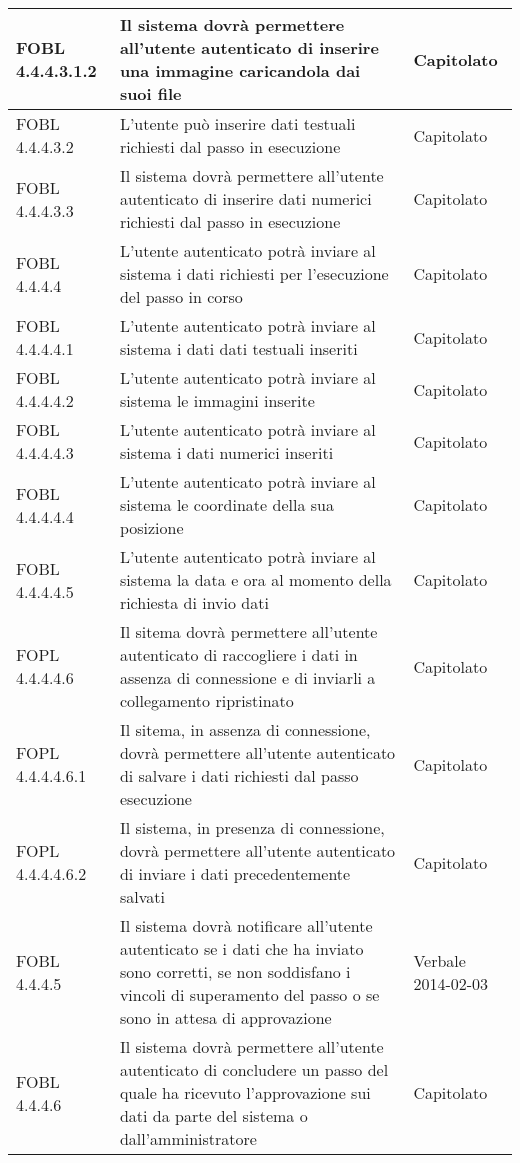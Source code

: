 \begin{longtable}{lXp{}}
\midrule
FOBL 4.4.4.3.1.2&Il sistema dovrà permettere all'utente autenticato di inserire una immagine caricandola dai suoi file&Capitolato\\
\midrule
FOBL 4.4.4.3.2&L'utente può inserire dati testuali richiesti dal passo in esecuzione&Capitolato\\
\midrule
FOBL 4.4.4.3.3&Il sistema dovrà permettere all'utente autenticato di inserire dati numerici richiesti dal passo in esecuzione&Capitolato\\
\midrule
FOBL 4.4.4.4&L'utente autenticato potrà inviare al sistema i dati richiesti per l'esecuzione del passo in corso&Capitolato\\
\midrule
FOBL 4.4.4.4.1&L'utente autenticato potrà inviare al sistema i dati dati testuali inseriti&Capitolato\\
\midrule
FOBL 4.4.4.4.2&L'utente autenticato potrà inviare al sistema le immagini inserite&Capitolato\\
\midrule
FOBL 4.4.4.4.3&L'utente autenticato potrà inviare al sistema i dati numerici inseriti&Capitolato\\
\midrule
FOBL 4.4.4.4.4&L'utente autenticato potrà inviare al sistema le coordinate della sua posizione&Capitolato\\
\midrule
FOBL 4.4.4.4.5&L'utente autenticato potrà inviare al sistema la data e ora al momento della richiesta di invio dati&Capitolato\\
\midrule
FOPL 4.4.4.4.6&Il sitema dovrà permettere all'utente autenticato di raccogliere i dati in assenza di connessione e di inviarli a collegamento ripristinato&Capitolato\\
\midrule
FOPL 4.4.4.4.6.1&Il sitema, in assenza di connessione, dovrà permettere all'utente autenticato di salvare i dati richiesti dal passo esecuzione&Capitolato\\
\midrule
FOPL 4.4.4.4.6.2&Il sistema, in presenza di connessione, dovrà permettere all'utente autenticato di inviare i dati precedentemente salvati&Capitolato\\
\midrule
FOBL 4.4.4.5&Il sistema dovrà notificare all'utente autenticato se i dati che ha inviato sono corretti, se non soddisfano i vincoli di superamento del passo o se sono in attesa di approvazione&Verbale 2014-02-03\\
\midrule
FOBL 4.4.4.6&Il sistema dovrà permettere all'utente autenticato di concludere un passo del quale ha ricevuto l'approvazione sui dati da parte del sistema o dall'amministratore&Capitolato\\
\midrule

\end{longtable}
